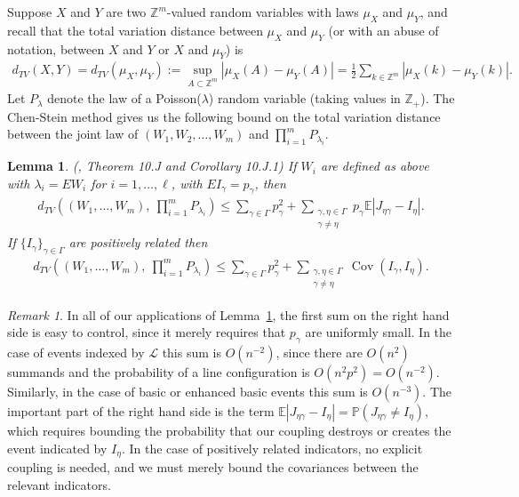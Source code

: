 \documentclass{amsart}
\newcommand{\E}[0]{\mathbb{E}}
\newcommand{\Cov}{\operatorname{Cov}}
\newcommand{\prob}{\mathbb{P}}
\newcommand{\abs}[1]{\left|#1\right|}
\numberwithin{equation}{section}
\newcommand{\lineset}{\mathscr{L}}
\newtheorem{lemma}[theorem]{Lemma}
\theoremstyle{definition}
\theoremstyle{remark}
\newtheorem{remark}[theorem]{Remark}
\begin{document}
Suppose $X$ and $Y$ are two $\mathbb{Z}^m$-valued random variables with laws $\mu_X$ and $\mu_Y$, and recall that the total variation distance between $\mu_X$ and $\mu_Y$ (or with an abuse of notation, between $X$ and $Y$ or $X$ and $\mu_Y$) is
\begin{align*}
d_{TV}(X,Y) = d_{TV}(\mu_X,\mu_Y) := \sup_{A\subset \mathbb{Z}^m} \abs{\mu_X(A) - \mu_Y(A)} = \frac{1}{2} \sum_{k \in \mathbb{Z}^m} \abs{\mu_X(k) - \mu_Y(k)} .
\end{align*}
Let $P_\lambda$ denote the law of a Poisson($\lambda$) random variable (taking values in $\mathbb{Z}_{+}$).  The Chen-Stein method gives us the following bound on the total variation distance between the joint law of $(W_1, W_2, \ldots, W_m)$ and $\prod_{i=1}^m P_{\lambda_i}$.
\begin{lemma}
\label{chen-stein}(\cite{poissonbook}, Theorem 10.J and Corollary 10.J.1)
If $W_i$ are defined as above with $\lambda_i = EW_i$ for $i=1, \ldots,\ell$, with $EI_\gamma = p_\gamma$, then
\begin{align}
\label{cs1}
d_{TV}\left((W_1, \ldots, W_m), \ \prod_{i=1}^m P_{\lambda_i}\right) \leq \sum_{\gamma \in \Gamma} p_\gamma^2 + \sum_{\substack{\gamma, \eta \in\Gamma \\ \gamma\neq\eta}} p_\gamma \E\abs{J_{\eta\gamma} - I_\eta}.
\end{align}
If $\{I_\gamma\}_{\gamma\in\Gamma}$ are positively related then
\begin{align}
\label{cs2}
d_{TV}\left((W_1, \ldots, W_m), \ \prod_{i=1}^m P_{\lambda_i}\right) \leq \sum_{\gamma \in \Gamma} p_\gamma^2 + \sum_{\substack{\gamma, \eta \in\Gamma \\ \gamma\neq\eta}} \Cov(I_\gamma, I_\eta).
\end{align}
\end{lemma}
\begin{remark}
In all of our applications of Lemma~\ref{chen-stein}, the first sum on the right hand side is easy to control, since it merely requires that $p_\gamma$ are uniformly small.  In the case of events indexed by $\lineset$ this sum is $O(n^{-2})$, since there are $O(n^2)$ summands and the probability of a line configuration is $O(n^2p^2) = O(n^{-2})$.  Similarly, in the case of basic or enhanced basic events this sum is $O(n^{-3})$.  The important part of the right hand side is the term $\E\abs{J_{\eta\gamma} - I_\eta} = \prob{(J_{\eta\gamma} \neq I_\eta)}{}$, which requires bounding the probability that our coupling destroys or creates the event indicated by $I_\eta$.  In the case of positively related indicators, no explicit coupling is needed, and we must merely bound the covariances between the relevant indicators.
\end{remark}
\end{document}

